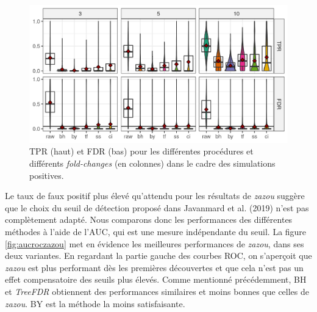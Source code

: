 \documentclass[12pt,a4paper]{reedthesis}
\theoremstyle{definition}
\theoremstyle{definition}
\theoremstyle{definition}
\theoremstyle{remark}
\begin{document}
\begin{figure}

{\centering \includegraphics[width=0.9\linewidth]{img/tprfdr_zazou} 

}

\caption{TPR (haut) et FDR (bas) pour les différentes procédures et différents \emph{fold-changes} (en colonnes) dans le cadre des simulations positives.}\label{fig:tprfdrzazou}
\end{figure}
Le taux de faux positif plus élevé qu'attendu pour les résultats de \emph{zazou} suggère que le choix du seuil de détection proposé dans Javanmard et al. (2019) n'est pas complètement adapté. Nous comparons donc les performances des différentes méthodes à l'aide de l'AUC, qui est une mesure indépendante du seuil. La figure \ref{fig:aucroczazou} met en évidence les meilleures performances de \emph{zazou}, dans ses deux variantes. En regardant la partie gauche des courbes ROC, on s'aperçoit que \emph{zazou} est plus performant dès les premières découvertes et que cela n'est pas un effet compensatoire des seuils plus élevés. Comme mentionné précédemment, BH et \emph{TreeFDR} obtiennent des performances similaires et moins bonnes que celles de \emph{zazou}. BY est la méthode la moins satisfaisante.
\end{document}
